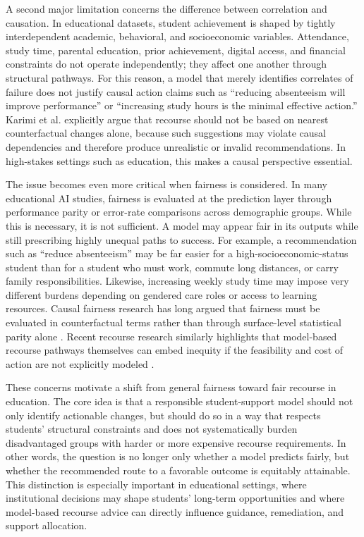 \documentclass[11pt]{article}
\begin{document}
A second major limitation concerns the difference between correlation and causation. In educational datasets, student achievement is shaped by tightly interdependent academic, behavioral, and socioeconomic variables. Attendance, study time, parental education, prior achievement, digital access, and financial constraints do not operate independently; they affect one another through structural pathways. For this reason, a model that merely identifies correlates of failure does not justify causal action claims such as ``reducing absenteeism will improve performance'' or ``increasing study hours is the minimal effective action.'' Karimi et al. \cite{Karimi2021} explicitly argue that recourse should not be based on nearest counterfactual changes alone, because such suggestions may violate causal dependencies and therefore produce unrealistic or invalid recommendations. In high-stakes settings such as education, this makes a causal perspective essential.

The issue becomes even more critical when fairness is considered. In many educational AI studies, fairness is evaluated at the prediction layer through performance parity or error-rate comparisons across demographic groups. While this is necessary, it is not sufficient. A model may appear fair in its outputs while still prescribing highly unequal paths to success. For example, a recommendation such as ``reduce absenteeism'' may be far easier for a high-socioeconomic-status student than for a student who must work, commute long distances, or carry family responsibilities. Likewise, increasing weekly study time may impose very different burdens depending on gendered care roles or access to learning resources. Causal fairness research has long argued that fairness must be evaluated in counterfactual terms rather than through surface-level statistical parity alone \cite{Kusner2017}. Recent recourse research similarly highlights that model-based recourse pathways themselves can embed inequity if the feasibility and cost of action are not explicitly modeled \cite{vonKugelgen2022}.

These concerns motivate a shift from general fairness toward fair recourse in education. The core idea is that a responsible student-support model should not only identify actionable changes, but should do so in a way that respects students' structural constraints and does not systematically burden disadvantaged groups with harder or more expensive recourse requirements. In other words, the question is no longer only whether a model predicts fairly, but whether the recommended route to a favorable outcome is equitably attainable. This distinction is especially important in educational settings, where institutional decisions may shape students' long-term opportunities and where model-based recourse advice can directly influence guidance, remediation, and support allocation.
\end{document}
